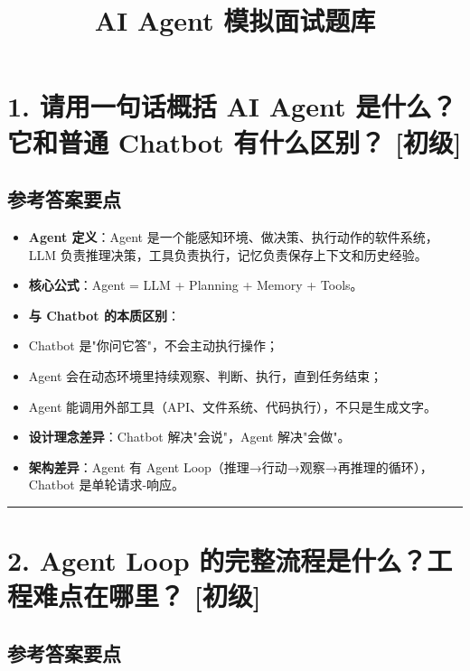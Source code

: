\documentclass[9pt,a4paper,twocolumn]{ctexart}
\newcommand{\lvchu}{\usebox{\badgechubox}}
\def\lvchu{[初级]}%
\begin{document}
\title{AI Agent 模拟面试题库}
\date{}
\maketitle
{}

\section*{1. 请用一句话概括 AI Agent 是什么？它和普通 Chatbot 有什么区别？ \lvchu{}}


\subsection*{参考答案要点}

\begin{itemize}[itemsep=1pt, topsep=2pt]
  \item \textbf{Agent 定义}：Agent 是一个能感知环境、做决策、执行动作的软件系统，LLM 负责推理决策，工具负责执行，记忆负责保存上下文和历史经验。
  \item \textbf{核心公式}：Agent = LLM + Planning + Memory + Tools。
  \item \textbf{与 Chatbot 的本质区别}：
  \item Chatbot 是"你问它答"，不会主动执行操作；
  \item Agent 会在动态环境里持续观察、判断、执行，直到任务结束；
  \item Agent 能调用外部工具（API、文件系统、代码执行），不只是生成文字。
  \item \textbf{设计理念差异}：Chatbot 解决"会说"，Agent 解决"会做"。
  \item \textbf{架构差异}：Agent 有 Agent Loop（推理→行动→观察→再推理的循环），Chatbot 是单轮请求-响应。
\end{itemize}


\vspace{2pt}
\noindent\rule{\columnwidth}{0.3pt}\vspace{2pt}



\section*{2. Agent Loop 的完整流程是什么？工程难点在哪里？ \lvchu{}}


\subsection*{参考答案要点}
\end{document}
